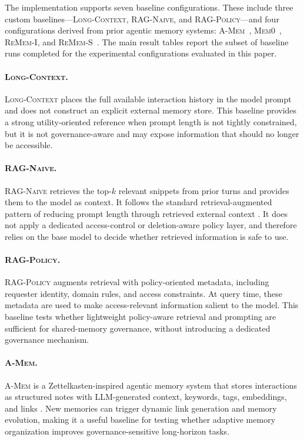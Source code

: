 \documentclass{llmxive}
\begin{document}
The implementation supports seven baseline configurations. These include three custom baselines---\textsc{Long-Context}, \textsc{RAG-Naive}, and \textsc{RAG-Policy}---and four configurations derived from prior agentic memory systems: \textsc{A-Mem}~\citep{xu2026mem}, \textsc{Mem0}~\citep{chhikara2025mem0}, \textsc{ReMem-I}, and \textsc{ReMem-S}~\citep{shu2026remem}. The main result tables report the subset of baseline runs completed for the experimental configurations evaluated in this paper.

\paragraph{\textsc{Long-Context}.}
\textsc{Long-Context} places the full available interaction history in the model prompt and does not construct an explicit external memory store. This baseline provides a strong utility-oriented reference when prompt length is not tightly constrained, but it is not governance-aware and may expose information that should no longer be accessible.

\paragraph{\textsc{RAG-Naive}.}
\textsc{RAG-Naive} retrieves the top-$k$ relevant snippets from prior turns and provides them to the model as context. It follows the standard retrieval-augmented pattern of reducing prompt length through retrieved external context \citep{lewis2020retrieval}. It does not apply a dedicated access-control or deletion-aware policy layer, and therefore relies on the base model to decide whether retrieved information is safe to use.

\paragraph{\textsc{RAG-Policy}.}
\textsc{RAG-Policy} augments retrieval with policy-oriented metadata, including requester identity, domain rules, and access constraints. At query time, these metadata are used to make access-relevant information salient to the model. This baseline tests whether lightweight policy-aware retrieval and prompting are sufficient for shared-memory governance, without introducing a dedicated governance mechanism.

\paragraph{\textsc{A-Mem}.}
\textsc{A-Mem} is a Zettelkasten-inspired agentic memory system that stores interactions as structured notes with LLM-generated context, keywords, tags, embeddings, and links \citep{xu2026mem}. New memories can trigger dynamic link generation and memory evolution, making it a useful baseline for testing whether adaptive memory organization improves governance-sensitive long-horizon tasks.
\end{document}
